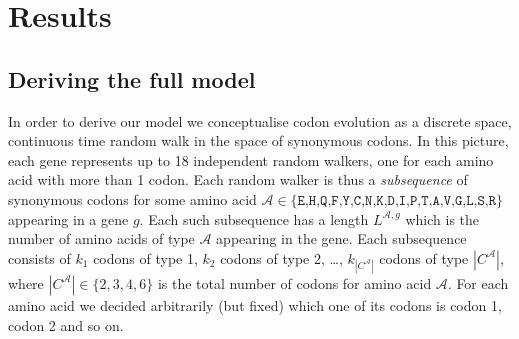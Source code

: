 \documentclass[a4paper,10pt]{paper}%
\begin{document}
\section{Results}


\subsection{Deriving the full model}

In order to derive our model we conceptualise  codon evolution as a  discrete space, continuous time random walk in the space of synonymous codons. In this picture, each gene  represents up to 18 independent random walkers, one for each amino acid with  more than 1 codon.    Each random walker is thus a {\em subsequence} of synonymous codons for some amino acid $\mathcal A \in \{\texttt{E,H,Q,F,Y,C,N,K,D,I,P,T,A,V,G,L,S,R}\}$  appearing in  a gene $g$.  Each such subsequence has a length $L^{\mathcal A,g}$ which is  the number of  amino acids of type $\mathcal A$ appearing in the gene. Each subsequence consists of $k_1$ codons of type 1, $k_2$ codons of type 2, \ldots, $k_{|C^\mathcal A|}$ codons of type $|C^\mathcal A|$, where $|C^\mathcal A|\in \{2,3,4,6\}$ is the total number of codons for amino acid $\mathcal A$. For each amino acid we decided arbitrarily (but fixed) which  one of its codons is codon  1, codon  2 and so on.  %
\end{document}

